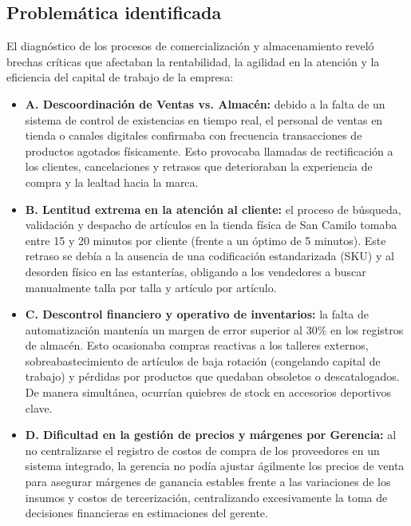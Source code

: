 \subsection{Problemática identificada}
\begin{indentedsubsection}
El diagnóstico de los procesos de comercialización y almacenamiento reveló brechas críticas que afectaban la rentabilidad, la agilidad en la atención y la eficiencia del capital de trabajo de la empresa:

\begin{itemize}
    \item \textbf{A. Descoordinación de Ventas vs. Almacén:} debido a la falta de un sistema de control de existencias en tiempo real, el personal de ventas en tienda o canales digitales confirmaba con frecuencia transacciones de productos agotados físicamente. Esto provocaba llamadas de rectificación a los clientes, cancelaciones y retrasos que deterioraban la experiencia de compra y la lealtad hacia la marca.
    \item \textbf{B. Lentitud extrema en la atención al cliente:} el proceso de búsqueda, validación y despacho de artículos en la tienda física de San Camilo tomaba entre 15 y 20 minutos por cliente (frente a un óptimo de 5 minutos). Este retraso se debía a la ausencia de una codificación estandarizada (SKU) y al desorden físico en las estanterías, obligando a los vendedores a buscar manualmente talla por talla y artículo por artículo.
    \item \textbf{C. Descontrol financiero y operativo de inventarios:} la falta de automatización mantenía un margen de error superior al 30\% en los registros de almacén. Esto ocasionaba compras reactivas a los talleres externos, sobreabastecimiento de artículos de baja rotación (congelando capital de trabajo) y pérdidas por productos que quedaban obsoletos o descatalogados. De manera simultánea, ocurrían quiebres de stock en accesorios deportivos clave.
    \item \textbf{D. Dificultad en la gestión de precios y márgenes por Gerencia:} al no centralizarse el registro de costos de compra de los proveedores en un sistema integrado, la gerencia no podía ajustar ágilmente los precios de venta para asegurar márgenes de ganancia estables frente a las variaciones de los insumos y costos de tercerización, centralizando excesivamente la toma de decisiones financieras en estimaciones del gerente.
\end{itemize}
\end{indentedsubsection}
